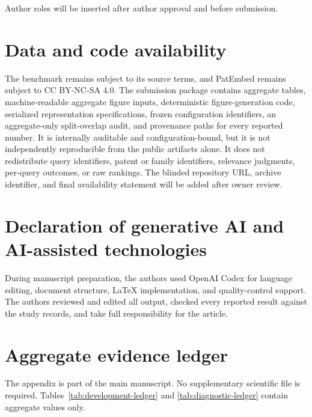 \documentclass[final,5p,times,twocolumn]{elsarticle}
\begin{document}
Author roles will be inserted after author approval and before submission.

\section*{Data and code availability}

The benchmark remains subject to its source terms, and PatEmbed remains subject
to CC BY-NC-SA 4.0. The submission package contains aggregate tables,
machine-readable aggregate figure inputs, deterministic figure-generation
code, serialized representation specifications, frozen configuration
identifiers, an aggregate-only split-overlap audit, and provenance paths for
every reported number. It is internally auditable and
configuration-bound, but it is not independently reproducible from the public
artifacts alone. It does not redistribute query
identifiers, patent or family identifiers, relevance judgments, per-query
outcomes, or raw rankings. The blinded repository URL, archive identifier,
and final availability statement will be added after owner review.

\section*{Declaration of generative AI and AI-assisted technologies}

During manuscript preparation, the authors used OpenAI Codex for language
editing, document structure, LaTeX implementation, and quality-control support.
The authors reviewed and edited all output, checked every reported result
against the study records, and take full responsibility for the article.


\ifdefined\RCRSReader\renewcommand{\bibfont}{\scriptsize}\fi


\ifdefined\RCRSReader\clearpage\onecolumn\fi
\appendix

\section{Aggregate evidence ledger}

The appendix is part of the main manuscript. No supplementary scientific file
is required. Tables~\ref{tab:development-ledger} and
\ref{tab:diagnostic-ledger} contain aggregate values only.
\end{document}
